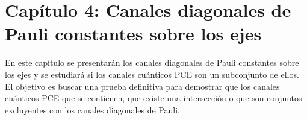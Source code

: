 \section*{Capítulo 4: Canales diagonales de Pauli constantes 
sobre los ejes}
En este capítulo se presentarán los canales diagonales de Pauli constantes 
sobre los ejes \cite{nathanson2007pauli} y se estudiará si los canales
cuánticos PCE son un subconjunto de ellos. El objetivo es buscar una 
prueba definitiva para demostrar que los canales cuánticos PCE que se contienen, 
que existe una intersección o que son conjuntos excluyentes con los canales 
diagonales de Pauli.